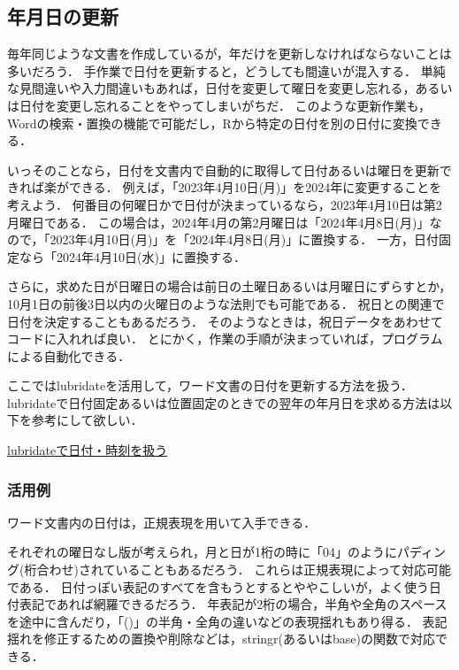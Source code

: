 \documentclass[
]{article}
\begin{document}
\hypertarget{ux5e74ux6708ux65e5ux306eux66f4ux65b0}{%
\subsection{年月日の更新}\label{ux5e74ux6708ux65e5ux306eux66f4ux65b0}}

毎年同じような文書を作成しているが，年だけを更新しなければならないことは多いだろう．
手作業で日付を更新すると，どうしても間違いが混入する．
単純な見間違いや入力間違いもあれば，日付を変更して曜日を変更し忘れる，あるいは日付を変更し忘れることをやってしまいがちだ．
このような更新作業も，Wordの検索・置換の機能で可能だし，Rから特定の日付を別の日付に変換できる．

いっそのことなら，日付を文書内で自動的に取得して日付あるいは曜日を更新できれば楽ができる．
例えば，「2023年4月10日(月)」を2024年に変更することを考えよう．
何番目の何曜日かで日付が決まっているなら，2023年4月10日は第2月曜日である．
この場合は，2024年4月の第2月曜日は「2024年4月8日(月)」なので，「2023年4月10日(月)」を「2024年4月8日(月)」に置換する．
一方，日付固定なら「2024年4月10日(水)」に置換する．

さらに，求めた日が日曜日の場合は前日の土曜日あるいは月曜日にずらすとか，10月1日の前後3日以内の火曜日のような法則でも可能である．
祝日との関連で日付を決定することもあるだろう．
そのようなときは，祝日データをあわせてコードに入れれば良い．
とにかく，作業の手順が決まっていれば，プログラムによる自動化できる．

ここではlubridateを活用して，ワード文書の日付を更新する方法を扱う．
lubridateで日付固定あるいは位置固定のときでの翌年の年月日を求める方法は以下を参考にして欲しい．

\protect\hyperlink{lubridate}{lubridateで日付・時刻を扱う}

\hypertarget{ux6d3bux7528ux4f8b-1}{%
\subsubsection{活用例}\label{ux6d3bux7528ux4f8b-1}}

ワード文書内の日付は，正規表現を用いて入手できる．

それぞれの曜日なし版が考えられ，月と日が1桁の時に「04」のようにパディング(桁合わせ)されていることもあるだろう．
これらは正規表現によって対応可能である．
日付っぽい表記のすべてを含もうとするとややこしいが，よく使う日付表記であれば網羅できるだろう．
年表記が2桁の場合，半角や全角のスペースを途中に含んだり，「()」の半角・全角の違いなどの表現揺れもあり得る．
表記揺れを修正するための置換や削除などは，stringr(あるいはbase)の関数で対応できる．
\end{document}

